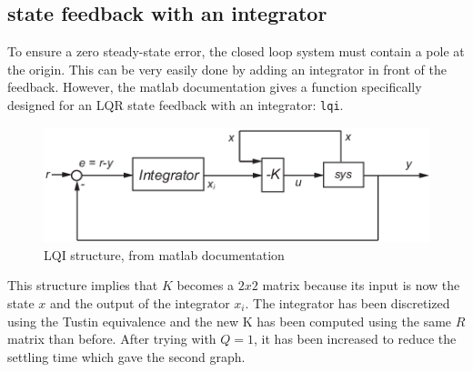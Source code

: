 \subsection{state feedback with an integrator}

To ensure a zero steady-state error, the closed loop system must contain a pole at the origin. This can be very easily 
done by adding an integrator in front of the feedback. However, the matlab documentation gives a function specifically
designed for an LQR state feedback with an integrator: \texttt{lqi}.

\begin{figure}[H]
    \centering
    \includegraphics[width = \textwidth]{Pictures/lqi_docs.png}
    \caption{LQI structure, from matlab documentation}
    \label{fig:lqi documentation}
\end{figure}

This structure implies that $K$ becomes a $2x2$ matrix because its input is now the state $x$ and the output of the 
integrator $x_i$. The integrator has been discretized using the Tustin equivalence and the new K has been computed using
the same $R$ matrix than before. After trying with $Q = 1$, it has been increased to reduce the settling time which gave
the second graph.

